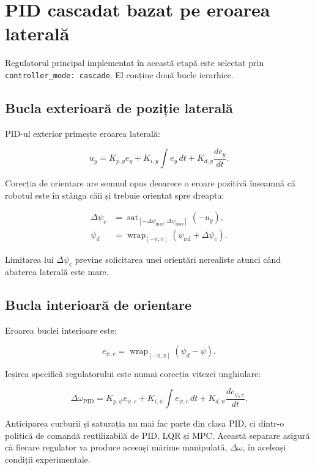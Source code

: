 \documentclass[12pt,a4paper,oneside]{report}
\newcommand{\sat}{\operatorname{sat}}
\newcommand{\wrap}{\operatorname{wrap}_{[-\pi,\pi]}}
\begin{document}
\section{PID cascadat bazat pe eroarea laterală}

Regulatorul principal implementat în această etapă este selectat prin
\texttt{controller\_mode: cascade}. El conține două bucle ierarhice.

\subsection{Bucla exterioară de poziție laterală}

PID-ul exterior primește eroarea laterală:

\begin{equation}
  u_y=K_{p,y}e_y+K_{i,y}\int e_y\,dt+K_{d,y}\frac{de_y}{dt}.
\end{equation}

Corecția de orientare are semnul opus deoarece o eroare pozitivă înseamnă că
robotul este în stânga căii și trebuie orientat spre dreapta:

\begin{align}
  \Delta\psi_c &= \sat_{[-\Delta\psi_{\max},\Delta\psi_{\max}]}(-u_y), \\
  \psi_d &= \wrap(\psi_{\mathrm{ref}}+\Delta\psi_c).
\end{align}

Limitarea lui $\Delta\psi_c$ previne solicitarea unei orientări nerealiste atunci
când abaterea laterală este mare.

\subsection{Bucla interioară de orientare}

Eroarea buclei interioare este:

\begin{equation}
  e_{\psi,c}=\wrap(\psi_d-\psi).
\end{equation}

Ieșirea specifică regulatorului este numai corecția vitezei unghiulare:

\begin{equation}
  \Delta\omega_{\mathrm{PID}}=
  K_{p,\psi}e_{\psi,c}+K_{i,\psi}\int e_{\psi,c}\,dt+
  K_{d,\psi}\frac{de_{\psi,c}}{dt}.
\end{equation}

Anticiparea curburii și saturația nu mai fac parte din clasa PID, ci dintr-o
politică de comandă reutilizabilă de PID, LQR și MPC. Această separare asigură
că fiecare regulator va produce aceeași mărime manipulată,
$\Delta\omega$, în aceleași condiții experimentale.
\end{document}
